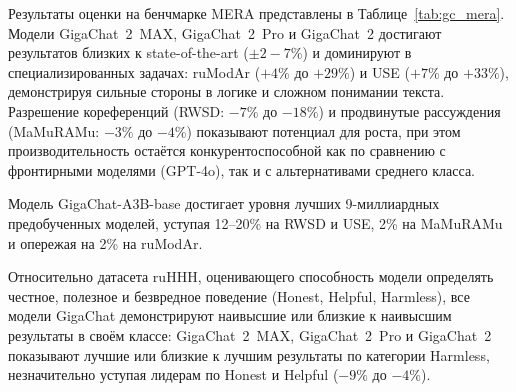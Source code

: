 Результаты оценки на бенчмарке MERA представлены в Таблице~\ref{tab:gc_mera}. Модели GigaChat~2~MAX, GigaChat~2~Pro и GigaChat~2 достигают результатов близких к state-of-the-art ($\pm 2{-}7\%$) и доминируют в специализированных задачах: ruModAr ($+4\%$ до $+29\%$) и USE ($+7\%$ до $+33\%$), демонстрируя сильные стороны в логике и сложном понимании текста. Разрешение кореференций (RWSD: $-7\%$ до $-18\%$) и продвинутые рассуждения (MaMuRAMu: $-3\%$ до $-4\%$) показывают потенциал для роста, при этом производительность остаётся конкурентоспособной как по сравнению с фронтирными моделями (GPT-4o), так и с альтернативами среднего класса.

Модель GigaChat-A3B-base достигает уровня лучших 9-миллиардных предобученных моделей, уступая 12--20\% на RWSD и USE, 2\% на MaMuRAMu и опережая на 2\% на ruModAr.

Относительно датасета ruHHH, оценивающего способность модели определять честное, полезное и безвредное поведение (Honest, Helpful, Harmless), все модели GigaChat демонстрируют наивысшие или близкие к наивысшим результаты в своём классе: GigaChat~2~MAX, GigaChat~2~Pro и GigaChat~2 показывают лучшие или близкие к лучшим результаты по категории Harmless, незначительно уступая лидерам по Honest и Helpful ($-9\%$ до $-4\%$).

